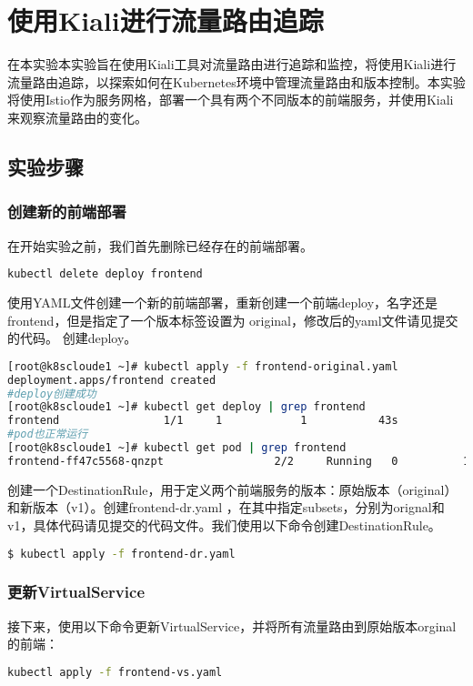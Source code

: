 \chapter{使用Kiali进行流量路由追踪}
在本实验本实验旨在使用Kiali工具对流量路由进行追踪和监控，将使用Kiali进行流量路由追踪，以探索如何在Kubernetes环境中管理流量路由和版本控制。本实验将使用Istio作为服务网格，部署一个具有两个不同版本的前端服务，并使用Kiali来观察流量路由的变化。
\section{实验步骤}
\subsection{创建新的前端部署}
在开始实验之前，我们首先删除已经存在的前端部署。
\begin{lstlisting}[language=bash]
	kubectl delete deploy frontend
\end{lstlisting}
使用YAML文件创建一个新的前端部署，重新创建一个前端deploy，名字还是frontend，但是指定了一个版本标签设置为 original，修改后的yaml文件请见提交的代码。
创建deploy。
\begin{lstlisting}[language=bash]
[root@k8scloude1 ~]# kubectl apply -f frontend-original.yaml 
deployment.apps/frontend created
#deploy创建成功
[root@k8scloude1 ~]# kubectl get deploy | grep frontend
frontend                1/1     1            1           43s
#pod也正常运行
[root@k8scloude1 ~]# kubectl get pod | grep frontend
frontend-ff47c5568-qnzpt                 2/2     Running   0          105s
\end{lstlisting}
创建一个DestinationRule，用于定义两个前端服务的版本：原始版本（original）和新版本（v1）。创建frontend-dr.yaml ，在其中指定subsets，分别为orignal和v1，具体代码请见提交的代码文件。我们使用以下命令创建DestinationRule。
\begin{lstlisting}[language=bash]
	$ kubectl apply -f frontend-dr.yaml
\end{lstlisting}

\subsection{更新VirtualService}

接下来，使用以下命令更新VirtualService，并将所有流量路由到原始版本orginal的前端：
\begin{lstlisting}[language=bash]
kubectl apply -f frontend-vs.yaml
\end{lstlisting}

